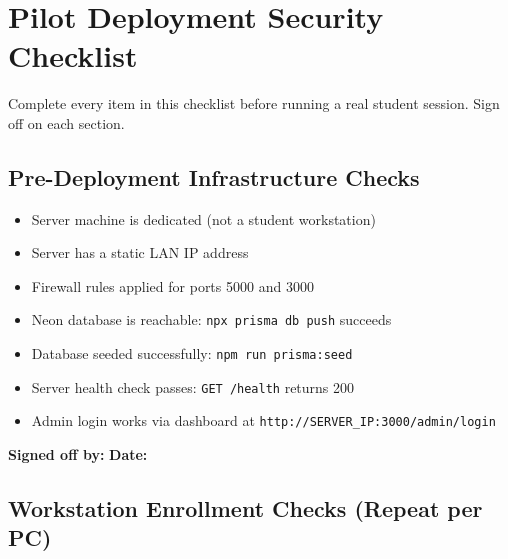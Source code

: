 \chapter{Pilot Deployment Security Checklist}
\label{app:security}

Complete every item in this checklist before running a real student session. Sign off on each section.

\section{Pre-Deployment Infrastructure Checks}

\begin{itemize}[label={\faSquare[regular]}, itemsep=6pt]
  \item[$\square$] Server machine is dedicated (not a student workstation)
  \item[$\square$] Server has a static LAN IP address
  \item[$\square$] Firewall rules applied for ports 5000 and 3000
  \item[$\square$] Neon database is reachable: \texttt{npx prisma db push} succeeds
  \item[$\square$] Database seeded successfully: \texttt{npm run prisma:seed}
  \item[$\square$] Server health check passes: \texttt{GET /health} returns 200
  \item[$\square$] Admin login works via dashboard at \texttt{http://SERVER\_IP:3000/admin/login}
\end{itemize}

\textbf{Signed off by:} \underline{\hspace{6cm}} \quad \textbf{Date:} \underline{\hspace{3cm}}

\section{Workstation Enrollment Checks (Repeat per PC)}

